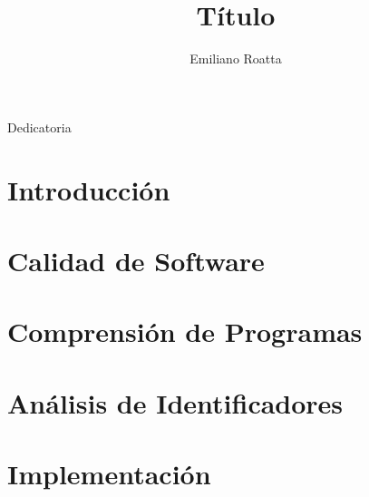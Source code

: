 \documentclass[a4paper,11pt,twoside,openright]{book}
\title{Título}
\author{Emiliano Roatta}
\begin{document}
\frontmatter

\maketitle

\begin{flushright}
\null{}
  Dedicatoria
\null
\end{flushright}



\tableofcontents
\listoffigures
\listoftables
\listofalgorithms

\mainmatter
\chapter{Introducción}


\chapter{Calidad de Software}


\chapter{Comprensión de Programas}






\chapter{Análisis de Identificadores}




\chapter{Implementación}






\backmatter
\end{document}
